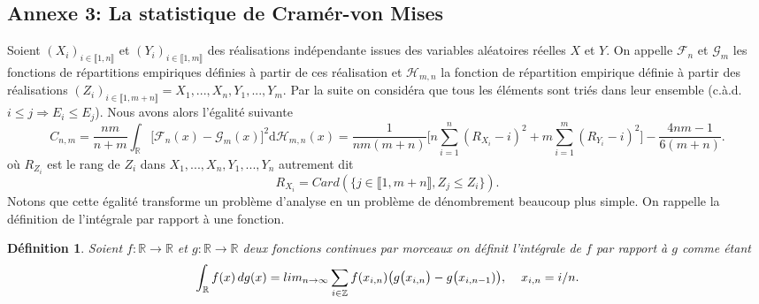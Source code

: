 \documentclass[a4paper,11pt]{article}
\numberwithin{equation}{section}
\newtheorem{definition}{Définition}
\begin{document}
\subsection{Annexe 3: La statistique de Cramér-von Mises}
\label{lemme Cramer-von Mise}
Soient $(X_i)_{i\in \llbracket 1,n \rrbracket}$ et $(Y_i)_{i\in \llbracket 1,m \rrbracket }$ des réalisations indépendante issues des variables aléatoires réelles $X$ et $Y$. On appelle $\mathcal{F}_{n}$ et $\mathcal{G}_{m}$ les fonctions de répartitions empiriques définies à partir de ces réalisation et $\mathcal{H}_{m,n}$ la fonction de répartition empirique définie à partir des réalisations $(Z_i)_{i\in \llbracket 1,m+n \rrbracket }=X_1,...,X_n,Y_1,...,Y_m$. Par la suite on considéra que tous les éléments sont triés dans leur ensemble (c.à.d. $i\leq j \Rightarrow E_i\leq E_j$). Nous avons alors l'égalité suivante
\begin{equation}
	C_{n,m}=\frac{nm}{n+m}\int_{\mathbb{R}}\big[ \mathcal{F}_{n}(x)-\mathcal{G}_{m}(x)\big]^{2} \mathrm{d} \mathcal{H}_{m,n}(x)=\frac{1}{nm(m+n)}\Big[ n\sum_{i=1}^{n}(R_{X_i}-i)^2+ m\sum_{i=1}^{m}(R_{Y_i}-i)^2\Big]-\frac{4nm-1}{6(m+n)}.
\end{equation}
où $R_{Z_i}$ est le rang de $Z_i$ dans $X_1,...,X_n,Y_1,...,Y_n$ autrement dit 
\[R_{X_i}=Card(\{j \in \llbracket 1,m+n \rrbracket , Z_j\leq Z_i\}).\] 
Notons que cette égalité transforme un problème d'analyse en un problème de dénombrement beaucoup plus simple. On rappelle la définition de l'intégrale par rapport à une fonction.
\begin{definition}
	Soient $f:\mathbb{R} \to \mathbb{R}$ et $g:\mathbb{R} \to \mathbb{R}$ deux fonctions continues par morceaux on définit l'intégrale de $f$ par rapport à $g$ comme étant
	\[\int_{\mathbb{R}}f(x)\, dg(x)=lim_{n\to\infty}\sum_{i \in \mathbb{Z}}f(x_{i,n})\big( g\big(x_{i,n}\big)-g\big(x_{i,n-1})\big),\hspace{4mm}x_{i,n}=i/n.\]
\end{definition}
\end{document}
